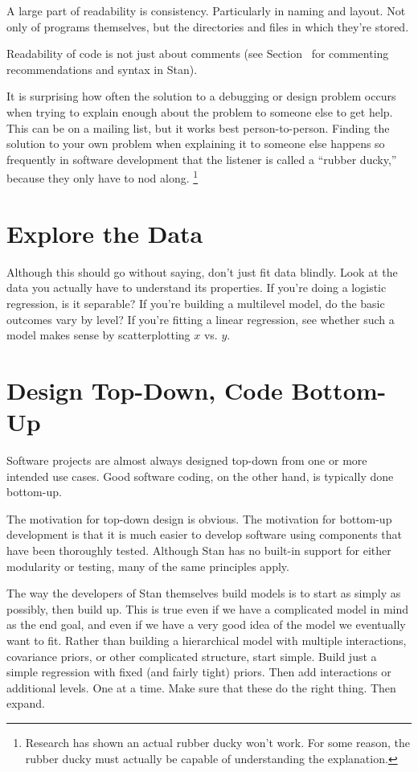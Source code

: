 A large part of readability is consistency.  Particularly in naming
and layout.  Not only of programs themselves, but the directories and
files in which they're stored.

Readability of code is not just about comments (see
Section~ for commenting
recommendations and syntax in Stan).

It is surprising how often the solution to a debugging or design
problem occurs when trying to explain enough about the problem to
someone else to get help.  This can be on a mailing list, but it works
best person-to-person.  Finding the solution to your own problem when
explaining it to someone else happens so frequently in software
development that the listener is called a ``rubber ducky,'' because
they only have to nod along.%
%
\footnote{Research has shown an actual rubber ducky won't work.  For
  some reason, the rubber ducky must actually be capable of
  understanding the explanation.}


\section{Explore the Data}

Although this should go without saying, don't just fit data blindly.
Look at the data you actually have to understand its properties.  If
you're doing a logistic regression, is it separable?  If you're
building a multilevel model, do the basic outcomes vary by level?  If
you're fitting a linear regression, see whether such a model makes
sense by scatterplotting $x$ vs. $y$.

\section{Design Top-Down, Code Bottom-Up}

Software projects are almost always designed top-down from one or more
intended use cases.  Good software coding, on the other hand, is
typically done bottom-up.

The motivation for top-down design is obvious.  The motivation for
bottom-up development is that it is much easier to develop software
using components that have been thoroughly tested.  Although Stan has
no built-in support for either modularity or testing, many of the same
principles apply.

The way the developers of Stan themselves build models is to start as
simply as possibly, then build up. This is true even if we have a
complicated model in mind as the end goal, and even if we have a very
good idea of the model we eventually want to fit.  Rather than
building a hierarchical model with multiple interactions, covariance
priors, or other complicated structure, start simple.  Build just a
simple regression with fixed (and fairly tight) priors.  Then add
interactions or additional levels.  One at a time.  Make sure that
these do the right thing.  Then expand.

